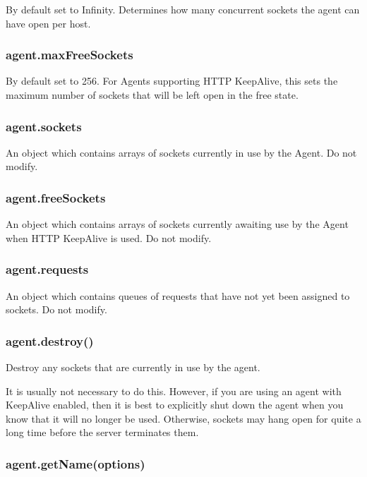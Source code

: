 By default set to Infinity. Determines how many concurrent sockets the
agent can have open per host.

\subsubsection{agent.maxFreeSockets}\label{agent.maxfreesockets}

By default set to 256. For Agents supporting HTTP KeepAlive, this sets
the maximum number of sockets that will be left open in the free state.

\subsubsection{agent.sockets}\label{agent.sockets}

An object which contains arrays of sockets currently in use by the
Agent. Do not modify.

\subsubsection{agent.freeSockets}\label{agent.freesockets}

An object which contains arrays of sockets currently awaiting use by the
Agent when HTTP KeepAlive is used. Do not modify.

\subsubsection{agent.requests}\label{agent.requests}

An object which contains queues of requests that have not yet been
assigned to sockets. Do not modify.

\subsubsection{agent.destroy()}\label{agent.destroy}

Destroy any sockets that are currently in use by the agent.

It is usually not necessary to do this. However, if you are using an
agent with KeepAlive enabled, then it is best to explicitly shut down
the agent when you know that it will no longer be used. Otherwise,
sockets may hang open for quite a long time before the server terminates
them.

\subsubsection{agent.getName(options)}\label{agent.getnameoptions}

